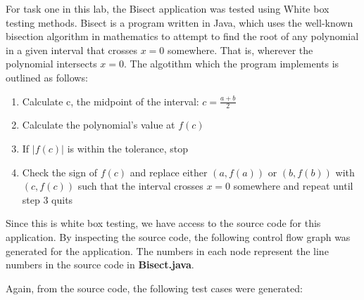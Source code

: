 For task one in this lab, the Bisect application was tested using White box
testing methods. Bisect is a program written in Java, which
uses the well-known bisection algorithm in mathematics to attempt to find the
root of any polynomial in a given interval that crosses $x=0$ somewhere. That
is, wherever the polynomial intersects $x=0$.
The algotithm which the program implements is outlined as follows:

\begin{enumerate}
	\item Calculate c, the midpoint of the interval: $ c = \frac{a+b}{2} $
	\item Calculate the polynomial's value at $f(c)$
	\item If $|f(c)|$ is within the tolerance, stop
	\item Check the sign of $f(c)$ and replace either $(a, f(a))$ or $(b, f(b))$
	      with $(c, f(c))$ such that the interval crosses $x=0$ somewhere and repeat
	      until step 3 quits
\end{enumerate}

Since this is white box testing, we have access to the source code for this
application. By inspecting the source code, the following control flow graph was
generated for the application. The numbers in each node represent the line
numbers in the source code in \textbf{Bisect.java}.



\begin{adjustbox}{center, height=\textheight}
\end{adjustbox}

Again, from the source code, the following test cases were generated:

